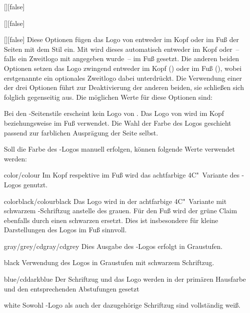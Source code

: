 \begin{Declaration}{[\PSet]}[false]
\begin{Declaration}[v2.02]{[\PSet]}[false]
\begin{Declaration}{[\PSet]}[false]
\printdeclarationlist%
%
%
Diese Optionen fügen das Logo von \DDC entweder im Kopf oder im Fuß der Seiten
mit dem Stil  ein. Mit  wird dieses 
automatisch entweder im Kopf oder~-- falls ein Zweitlogo mit  
angegeben wurde~-- im Fuß gesetzt. Die anderen beiden Optionen setzen das Logo 
zwingend entweder im Kopf () oder im Fuß (), 
wobei erstgenannte ein optionales Zweitlogo dabei unterdrückt. Die Verwendung 
einer der drei Optionen führt zur Deaktivierung der anderen beiden, sie 
schließen sich folglich gegenseitig aus. Die möglichen Werte für diese Optionen 
sind:
%
\begin{values}
\itemfalse
  Bei den -Seitenstile erscheint kein Logo von \DDC.
\itemtrue*
  Das Logo von \DDC wird im Kopf beziehungsweise im Fuß verwendet. Die Wahl der 
  Farbe des Logos geschieht passend zur farblichen Ausprägung der Seite selbst.
\end{values}
%
Soll die Farbe des \DDC-Logos manuell erfolgen, können folgende Werte verwendet 
werden:
%
\begin{values}
\item[color/colour]
  Im Kopf respektive im Fuß wird das achtfarbige 4C"~Variante des \DDC-Logos 
  genutzt.
\item[colorblack/colourblack]
  Das Logo wird in der achtfarbige 4C"~Variante mit schwarzem \DDC-Schriftzug 
  anstelle des grauen. Für den Fuß wird der grüne Claim ebenfalls durch einen 
  schwarzen ersetzt. Dies ist insbesondere für kleine Darstellungen des Logos 
  im Fuß sinnvoll.
\item[gray/grey/cdgray/cdgrey]
  Dies Ausgabe des \DDC-Logos erfolgt in Graustufen.
\item[black]
  Verwendung des Logos in Graustufen mit schwarzem Schriftzug.
\item[blue/cddarkblue]
  Der Schriftzug und das Logo werden in der primären Hausfarbe  
  und den entsprechenden Abstufungen gesetzt
\item[white]
  Sowohl \DDC-Logo als auch der dazugehörige Schriftzug sind vollständig weiß.
\end{values}
%
\end{Declaration}
\end{Declaration}
\end{Declaration}

